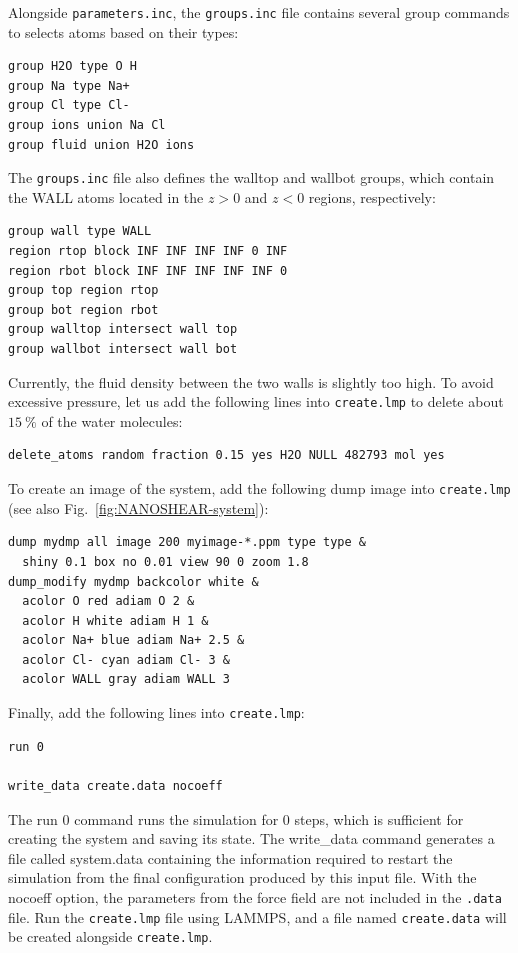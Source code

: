 \documentclass[9pt,tutorial]{livecoms}
\newcommand{\lmpcmd}[1]{\hspace{0pt}\colorbox{listing}{\textcolor{command}{\small{#1}}}\hspace{0pt}} %
\newcommand{\flecmd}[1]{\textcolor{command}{\texttt{#1}}} %
\begin{document}
Alongside \flecmd{parameters.inc}, the \flecmd{groups.inc} file contains
several \lmpcmd{group} commands to selects atoms based on their types:
\begin{lstlisting}
group H2O type O H
group Na type Na+
group Cl type Cl-
group ions union Na Cl
group fluid union H2O ions
\end{lstlisting}
The \flecmd{groups.inc} file also defines the \lmpcmd{walltop} and \lmpcmd{wallbot}
groups, which contain the WALL atoms located in the $z > 0$ and $z < 0$ regions, respectively:
\begin{lstlisting}
group wall type WALL
region rtop block INF INF INF INF 0 INF
region rbot block INF INF INF INF INF 0
group top region rtop
group bot region rbot
group walltop intersect wall top
group wallbot intersect wall bot
\end{lstlisting}

Currently, the fluid density between the two walls is slightly too high.  To avoid
excessive pressure, let us add the following lines into \flecmd{create.lmp}
to delete about $15~\%$ of the water molecules:
\begin{lstlisting}
delete_atoms random fraction 0.15 yes H2O NULL 482793 mol yes
\end{lstlisting}

To create an image of the system, add the following \lmpcmd{dump} image
into \flecmd{create.lmp} (see also Fig.~\ref{fig:NANOSHEAR-system}):
\begin{lstlisting}
dump mydmp all image 200 myimage-*.ppm type type &
  shiny 0.1 box no 0.01 view 90 0 zoom 1.8
dump_modify mydmp backcolor white &
  acolor O red adiam O 2 &
  acolor H white adiam H 1 &
  acolor Na+ blue adiam Na+ 2.5 &
  acolor Cl- cyan adiam Cl- 3 &
  acolor WALL gray adiam WALL 3
\end{lstlisting}

Finally, add the following lines into \flecmd{create.lmp}:
\begin{lstlisting}
run 0

write_data create.data nocoeff
\end{lstlisting}
The \lmpcmd{run 0} command runs the simulation for 0 steps, which is sufficient for
creating the system and saving its state.  The \lmpcmd{write\_data} command
generates a file called \lmpcmd{system.data} containing the information required
to restart the simulation from the final configuration produced by this input
file.  With the \lmpcmd{nocoeff} option, the parameters from the force field are
not included in the \flecmd{.data} file.  Run the \flecmd{create.lmp} file using LAMMPS,
and a file named \flecmd{create.data} will be created alongside \flecmd{create.lmp}.
\end{document}
